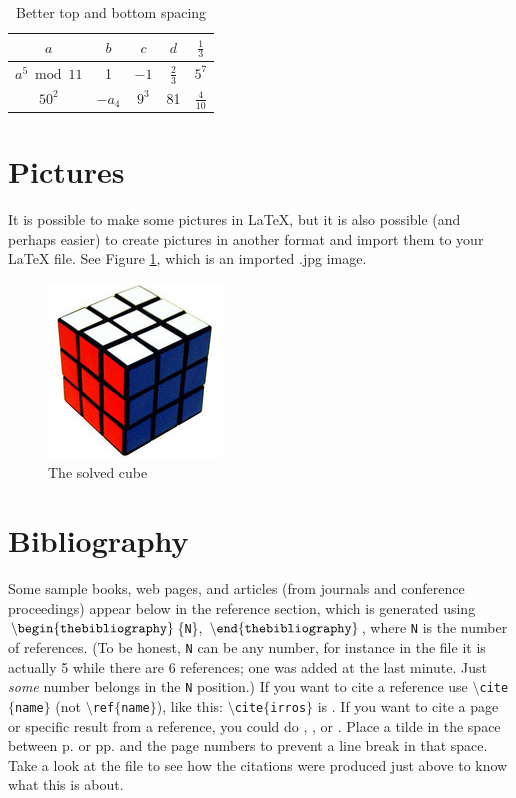 \documentclass[12pt,letterpaper]{amsart}
\newcommand{\sm}{\setminus}
\newcommand{\tfix}{\rule{0pt}{2.6ex}}
\newcommand{\bfix}{\rule[-1.2ex]{0pt}{0pt}}
\newcommand{\pln}[1]{$\sm${\tt #1}}
\newcommand{\bgn}[1]{$\tt {\sm}begin\{#1\}$}
\newcommand{\nd}[1]{$\tt {\sm}end\{#1\}$}
\theoremstyle{plain}
\theoremstyle{definition}
\numberwithin{equation}{section}
\begin{document}
\begin{table}[ht]
\begin{center}
\begin{tabular}{c||c|c|c|c} \hline
\tfix \bfix $a$  & $b$ & $c$ & $d$ &  $\frac{1}{3}$ \\ \hline
\tfix \bfix $a^{5} \bmod 11$ & 1& $-1$ & $\frac{2}{3}$ & $5^7$    \\ \hline 
\tfix \bfix $50^2$ & $-a_4$ & $9^3$ & 81 & $\frac{4}{10}$ \\ \hline 
\end{tabular}
\caption{Better top and bottom spacing}\label{tootop3}
\end{center}
\end{table}



\section{Pictures}


It is possible to make some pictures in LaTeX, but it is also possible (and perhaps 
easier) to create pictures in another format and import them to your LaTeX file. 
See Figure \ref{cube}, which is an imported .jpg image. 



   \begin{figure}[ht]
   \center
    \includegraphics{cubefaces.jpg}
\caption{The solved cube}\label{cube}
 \end{figure}

\section{Bibliography}

Some sample books, web pages, and articles (from journals and conference 
proceedings) appear below in the reference section, which is generated using 
\bgn{thebibliography}\{{\tt N}\},
\nd{thebibliography}, 
where {\tt N} 
is the number of references.  (To be honest, 
{\tt N} can be any number,  
for instance in the file 
it is actually 5 while there are 6 references; one was added 
at the last minute.  Just {\it some} number belongs in the 
{\tt N} position.)
If you want to cite a reference use 
\pln{cite}$\{${\tt name}$\}$ (not \pln{ref}$\{${\tt name}$\}$), 
like this: \pln{cite}$\{${\tt irros}$\}$ is \cite{irros}.  If you 
want to cite a page or specific result from a reference, you could do 
\cite[p.~340]{irros}, \cite[pp.~340--342]{irros}, or 
\cite[Theorem 20.1.1]{irros}. 
Place a tilde in the space between p. or pp. and the page 
numbers to prevent a line break in that space.  Take a look at the file 
to see how the citations were produced just above to know what this is about.
\end{document}
